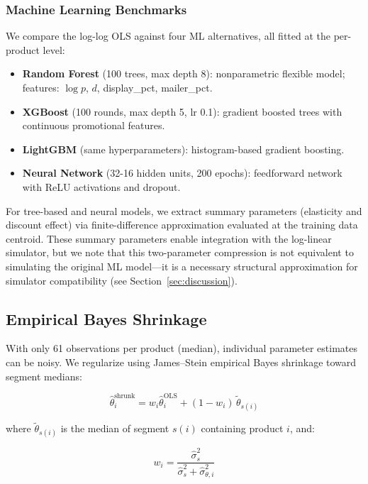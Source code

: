 \documentclass[12pt,a4paper]{article}
\begin{document}
\subsubsection{Machine Learning Benchmarks}

We compare the log-log OLS against four ML alternatives, all fitted
at the per-product level:

\begin{itemize}[nosep]
\item \textbf{Random Forest} (100 trees, max depth 8): nonparametric
flexible model; features: $\log p$, $d$, display\_pct, mailer\_pct.
\item \textbf{XGBoost} (100 rounds, max depth 5, lr 0.1): gradient
boosted trees with continuous promotional features.
\item \textbf{LightGBM} (same hyperparameters): histogram-based
gradient boosting.
\item \textbf{Neural Network} (32-16 hidden units, 200 epochs):
feedforward network with ReLU activations and dropout.
\end{itemize}

For tree-based and neural models, we extract summary parameters
(elasticity and discount effect) via finite-difference
approximation evaluated at the training data centroid. These
summary parameters enable integration with the log-linear simulator,
but we note that this two-parameter compression is not equivalent to
simulating the original ML model---it is a necessary structural
approximation for simulator compatibility (see
Section~\ref{sec:discussion}).

\subsection{Empirical Bayes Shrinkage}
\label{sec:shrinkage}

With only 61 observations per product (median), individual
parameter estimates can be noisy. We regularize using James--Stein
empirical Bayes shrinkage toward segment medians:

\begin{equation}
\hat{\theta}_i^{\text{shrunk}} = w_i \hat{\theta}_i^{\text{OLS}}
+ (1 - w_i) \, \tilde{\theta}_{s(i)}
\end{equation}

where $\tilde{\theta}_{s(i)}$ is the median of segment $s(i)$
containing product $i$, and:

\begin{equation}
\label{eq:js-weight}
w_i = \frac{\hat{\sigma}_{s}^2}
{\hat{\sigma}_{s}^2 + \hat{\sigma}_{\theta,i}^2}
\end{equation}
\end{document}

